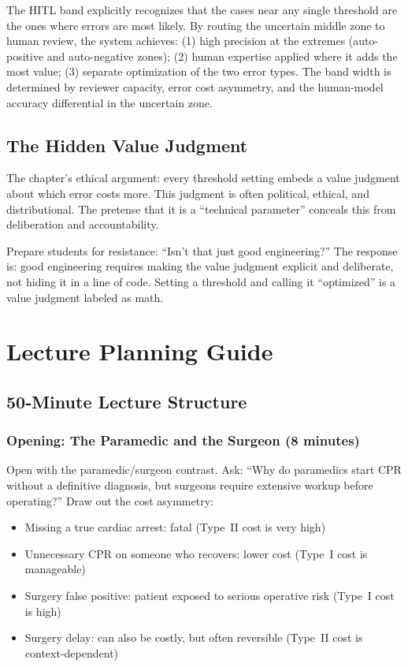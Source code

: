 \begin{keyconcept}
The HITL band explicitly recognizes that the cases near any single threshold are the ones where errors are most likely. By routing the uncertain middle zone to human review, the system achieves: (1) high precision at the extremes (auto-positive and auto-negative zones); (2) human expertise applied where it adds the most value; (3) separate optimization of the two error types. The band width is determined by reviewer capacity, error cost asymmetry, and the human-model accuracy differential in the uncertain zone.
\end{keyconcept}

\subsection{The Hidden Value Judgment}

The chapter's ethical argument: every threshold setting embeds a value judgment about which error costs more. This judgment is often political, ethical, and distributional. The pretense that it is a ``technical parameter'' conceals this from deliberation and accountability.

Prepare students for resistance: ``Isn't that just good engineering?'' The response is: good engineering requires making the value judgment explicit and deliberate, not hiding it in a line of code. Setting a threshold and calling it ``optimized'' is a value judgment labeled as math.

\section{Lecture Planning Guide}

\subsection{50-Minute Lecture Structure}

\subsubsection{Opening: The Paramedic and the Surgeon (8 minutes)}

Open with the paramedic/surgeon contrast. Ask: ``Why do paramedics start CPR without a definitive diagnosis, but surgeons require extensive workup before operating?'' Draw out the cost asymmetry:
\begin{itemize}
    \item Missing a true cardiac arrest: fatal (Type~II cost is very high)
    \item Unnecessary CPR on someone who recovers: lower cost (Type~I cost is manageable)
    \item Surgery false positive: patient exposed to serious operative risk (Type~I cost is high)
    \item Surgery delay: can also be costly, but often reversible (Type~II cost is context-dependent)
\end{itemize}

